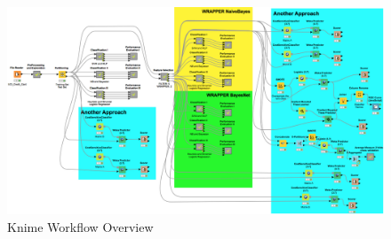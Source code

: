 \documentclass[fleqn,10pt]{SelfArx} %
\begin{document}
	\begin{figure}[ht!]
		\centering
		\includegraphics[width=\linewidth]{Workflow.png}
		\caption{Knime Workflow Overview}
	\end{figure}

	\nocite{DataSet}
	\nocite{LucaNoteBook}
	\nocite{Default}
	\nocite{ItalPress}
	\nocite{SMOTE}
	
	
	
	
\end{document}
